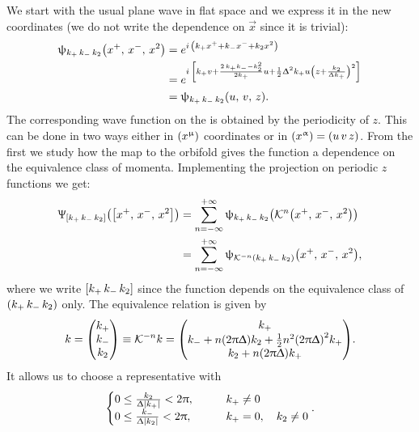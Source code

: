 We start with the usual plane wave in flat space and we express it in the new coordinates (we do not write the dependence on $\vec{x}$ since it is trivial):
\begin{equation}
  \begin{split}
    \psi_{k_+\, k_-\, k_2}\qty(x^+,\, x^-,\, x^2)
    & =
    e^{i\, \qty( k_+ x^+ + k_- x^- + k_2 x^2 )}
    \\
    & =
    e^{%
      i\, \qty[%
        k_+ v
        +
        \frac{2\, k_+ k_- - k_2^2}{2 k_+} u
        +
        \frac{1}{2} \Delta^2 k_+ u
        \qty( z + \frac{k_2}{\Delta k_+} )^2
      ]
    }
    \\
    & =
    \psi_{k_+\, k_-\, k_2}\qty(u,\, v,\, z).
  \end{split}
\end{equation}
The corresponding wave function on the \nbo is obtained by the periodicity of $z$.
This can be done in two ways either in $\qty(x^{\upmu})$ coordinates or in $\qty(x^{\upalpha}) = \qty(u\, v\, z)$.
From the first we study how the map to the orbifold gives the function a dependence on the equivalence class of momenta.
Implementing the projection on periodic $z$ functions we get:
\begin{equation}
  \begin{split}
    \Uppsi_{\qty[k_+\, k_-\, k_2]}\qty(\qty[x^+,\, x^-,\, x^2])
    & =
    \sum\limits_{n = -\infty}^{+\infty}
    \uppsi_{k_+\, k_-\, k_2}\qty( \mathcal{K}^n\qty(x^+,\, x^-,\, x^2) )
    \\
    & =
    \sum\limits_{n = -\infty}^{+\infty}
    \uppsi_{\mathcal{K}^{-n}\qty( k_+\, k_-\, k_2 )}\qty( x^+,\, x^-,\, x^2 ),
  \end{split}
\end{equation}
where we write $\qty[k_+\, k_-\, k_2]$ since the function depends on the equivalence class of $\qty(k_+\, k_-\, k_2)$ only.
The equivalence relation is given by
\begin{equation}
  k =
  \mqty(
     k_+\\ k_-\\ k_2
  )
  \equiv
  \cK^{-n} k
  =
  \mqty(
    k_+ 
    \\ 
    k_- + n \qty(2 \pi \Delta) k_2 + \frac{1}{2} n^2 \qty(2 \pi \Delta)^2 k_+
    \\
    k_2 + n \qty(2 \pi \Delta) k_+
  ).
  \end{equation}
It allows us to choose a representative with
\begin{equation}
  \begin{cases}
    0 \le \frac{k_2}{\Updelta \abs{k_+}} < 2 \uppi,
    & \qquad
    k_+ \neq 0
    \\
    0 \le \frac{k_-}{\Updelta \abs{k_2}} < 2 \uppi,
    & \qquad
    k_+ = 0, \quad k_2 \neq 0
  \end{cases}.
\end{equation}
  
